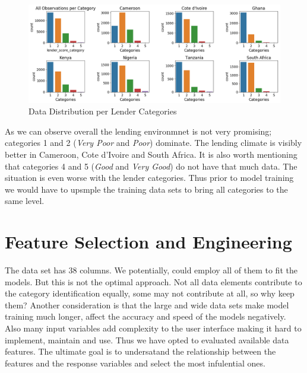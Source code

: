 \begin{Schunk}
\begin{figure}[H]

{\centering \includegraphics[width=1.15\linewidth]{../../artifacts/lcategories} 

}

\caption[Data Distribution per Lender Categories]{Data Distribution per Lender Categories}\label{fig:dl}
\end{figure}
\end{Schunk}

As we can observe overall the lending environmnet is not very promising;
categories 1 and 2 (\emph{Very Poor} and \emph{Poor}) dominate. The
lending climate is visibly better in Cameroon, Cote d'Ivoire and South
Africa. It is also worth mentioning that categories 4 and 5 (\emph{Good}
and \emph{Very Good}) do not have that much data. The situation is even
worse with the lender categories. Thus prior to model training we would
have to upsmple the training data sets to bring all categories to the
same level.

\hypertarget{feature-selection-and-engineering}{%
\section{Feature Selection and
Engineering}\label{feature-selection-and-engineering}}

The data set has 38 columns. We potentially, could employ all of them to
fit the models. But this is not the optimal approach. Not all data
elements contribute to the category identification equally, some may not
contribute at all, so why keep them? Another consideration is that the
large and wide data sets make model training much longer, affect the
accuracy and speed of the models negatively. Also many input variables
add complexity to the user interface making it hard to implement,
maintain and use. Thus we have opted to evaluated available data
features. The ultimate goal is to undersatand the relationship between
the features and the response variables and select the most infulential
ones.


